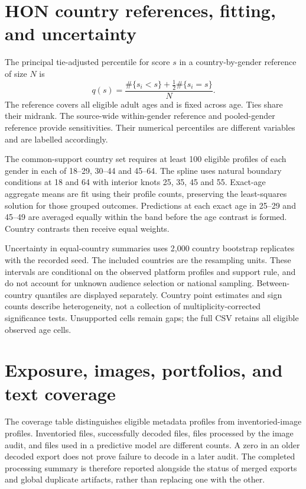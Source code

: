 \section{HON country references, fitting, and uncertainty}

The principal tie-adjusted percentile for score $s$ in a country-by-gender reference of size $N$ is
\begin{equation}
q(s)=\frac{\#\{s_i<s\}+\tfrac12\#\{s_i=s\}}{N}.
\end{equation}
The reference covers all eligible adult ages and is fixed across age. Ties share their midrank. The source-wide within-gender reference and pooled-gender reference provide sensitivities. Their numerical percentiles are different variables and are labelled accordingly.

The common-support country set requires at least 100 eligible profiles of each gender in each of 18--29, 30--44 and 45--64. The spline uses natural boundary conditions at 18 and 64 with interior knots 25, 35, 45 and 55. Exact-age aggregate means are fit using their profile counts, preserving the least-squares solution for those grouped outcomes. Predictions at each exact age in 25--29 and 45--49 are averaged equally within the band before the age contrast is formed. Country contrasts then receive equal weights.

Uncertainty in equal-country summaries uses 2,000 country bootstrap replicates with the recorded seed. The included countries are the resampling units. These intervals are conditional on the observed platform profiles and support rule, and do not account for unknown audience selection or national sampling. Between-country quantiles are displayed separately. Country point estimates and sign counts describe heterogeneity, not a collection of multiplicity-corrected significance tests. Unsupported cells remain gaps; the full CSV retains all eligible observed age cells.





\section{Exposure, images, portfolios, and text coverage}

The coverage table distinguishes eligible metadata profiles from inventoried-image profiles. Inventoried files, successfully decoded files, files processed by the image audit, and files used in a predictive model are different counts. A zero in an older decoded export does not prove failure to decode in a later audit. The completed processing summary is therefore reported alongside the status of merged exports and global duplicate artifacts, rather than replacing one with the other.

